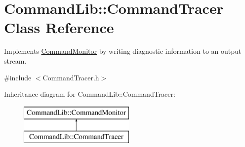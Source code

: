 \hypertarget{class_command_lib_1_1_command_tracer}{}\section{Command\+Lib\+:\+:Command\+Tracer Class Reference}
\label{class_command_lib_1_1_command_tracer}


Implements \mbox{\hyperlink{class_command_lib_1_1_command_monitor}{Command\+Monitor}} by writing diagnostic information to an output stream.  




{\ttfamily \#include $<$Command\+Tracer.\+h$>$}

Inheritance diagram for Command\+Lib\+:\+:Command\+Tracer\+:\begin{figure}[H]
\begin{center}
\leavevmode
\includegraphics[height=2.000000cm]{class_command_lib_1_1_command_tracer}
\end{center}
\end{figure}
